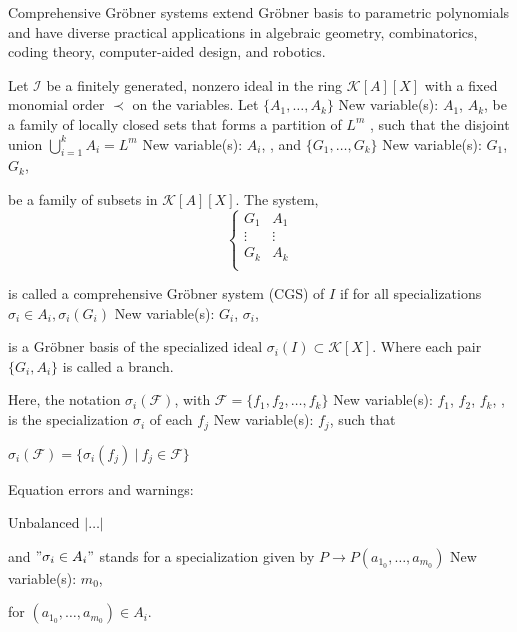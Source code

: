 \documentclass[runningheads]{llncs}
\newcommand{\1}{\chi}
\begin{document}
Comprehensive Gr{\"o}bner systems extend Gr{\"o}bner basis to 
parametric polynomials and have diverse practical applications in 
algebraic geometry, combinatorics, coding theory, computer-aided design, and robotics.
\begin{definition}
    Let \(\mathcal{I}\) be a finitely generated, nonzero ideal in the ring \(\mathcal{K}[A][X]\) with a fixed monomial order \(\prec\) on the variables. 
    Let \(\{A_1,\dots,A_k\}\)
{\color{blue} New variable(s): \(A_1\), \(A_k\),  }
 be a family of locally closed sets that forms a partition of \(L^m\) 
    , such that the disjoint union \(\bigcup\limits_{i=1}^k A_i=L^m\)
{\color{blue} New variable(s): \(A_i\),  }
, and \(\{G_1,\dots,G_k\}\)
{\color{blue} New variable(s): \(G_1\), \(G_k\),  }
 
    be a family of subsets in \(\mathcal{K}[A][X]\).
    The system, 
	\begin{equation}\label{CGS}
	\left\{
		\begin{array}{ll}
			G_1 & A_1 \\
			\vdots  & \vdots \\ 
			G_k & A_k \\
		\end{array}
		\right. 
	\end{equation}

    is called a comprehensive Gr{\"o}bner system (CGS) of \(I\)
     if for all specializations \(\sigma_i \in A_i, \sigma_i (G_i)\)
{\color{blue} New variable(s): \(G_i\), \(\sigma _i\),  }
 
     is a Gr{\"o}bner basis of the specialized ideal \(\sigma_i (I)\subset \mathcal{K}[X]\).
     Where each pair \(\{G_i,A_i\}\) is called a branch. 
\end{definition}
Here, the notation \(\sigma_i (\mathcal{F})\), with \(\mathcal{F}=\{f_1,f_2,\dots ,f_k\}\)
{\color{blue} New variable(s): \(f_1\), \(f_2\), \(f_k\),  }
, is the specialization \(\sigma_i\)
of each \(f_j\)
{\color{blue} New variable(s): \(f_j\),  }
 such that  {\color{red} \(\sigma_i (\mathcal{F})=\{\sigma_i(f_j)~|~ f_j\in \mathcal{F}\}\)

  Equation errors and warnings:

 Unbalanced $|\hdots|$}


and  \("\sigma_i \in A_i"\) stands for a specialization given by \(P\rightarrow P(a_{1_0},\dots,a_{m_0})\)
{\color{blue} New variable(s): \(m_0\),  }
 
for \((a_{1_0},\dots,a_{m_0})\in A_i\).\\
\end{document}

